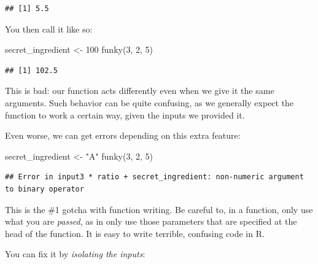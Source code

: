 \documentclass[
]{book}
\newenvironment{Shaded}{\begin{snugshade}}{\end{snugshade}}
\newcommand{\DecValTok}[1]{\textcolor[rgb]{0.00,0.00,0.81}{#1}}
\newcommand{\FunctionTok}[1]{\textcolor[rgb]{0.00,0.00,0.00}{#1}}
\newcommand{\NormalTok}[1]{#1}
\newcommand{\OtherTok}[1]{\textcolor[rgb]{0.56,0.35,0.01}{#1}}
\newcommand{\StringTok}[1]{\textcolor[rgb]{0.31,0.60,0.02}{#1}}
\begin{document}
\begin{verbatim}
## [1] 5.5
\end{verbatim}

You then call it like so:

\begin{Shaded}
\begin{Highlighting}[]
\NormalTok{secret\_ingredient }\OtherTok{\textless{}{-}} \DecValTok{100}
\FunctionTok{funky}\NormalTok{(}\DecValTok{3}\NormalTok{, }\DecValTok{2}\NormalTok{, }\DecValTok{5}\NormalTok{)}
\end{Highlighting}
\end{Shaded}

\begin{verbatim}
## [1] 102.5
\end{verbatim}

This is bad: our function acts differently even when we give it the same arguments.
Such behavior can be quite confusing, as we generally expect the function to work a certain way, given the inputs we provided it.

Even worse, we can get errors depending on this extra feature:

\begin{Shaded}
\begin{Highlighting}[]
\NormalTok{secret\_ingredient }\OtherTok{\textless{}{-}} \StringTok{"A"}
\FunctionTok{funky}\NormalTok{(}\DecValTok{3}\NormalTok{, }\DecValTok{2}\NormalTok{, }\DecValTok{5}\NormalTok{)}
\end{Highlighting}
\end{Shaded}

\begin{verbatim}
## Error in input3 * ratio + secret_ingredient: non-numeric argument to binary operator
\end{verbatim}

This is the \#1 gotcha with function writing.
Be careful to, in a function, only use what you are \emph{passed}, as in only use those parameters that are specified at the head of the function.
It is easy to write terrible, confusing code in R.

You can fix it by \emph{isolating the inputs}:
\end{document}
